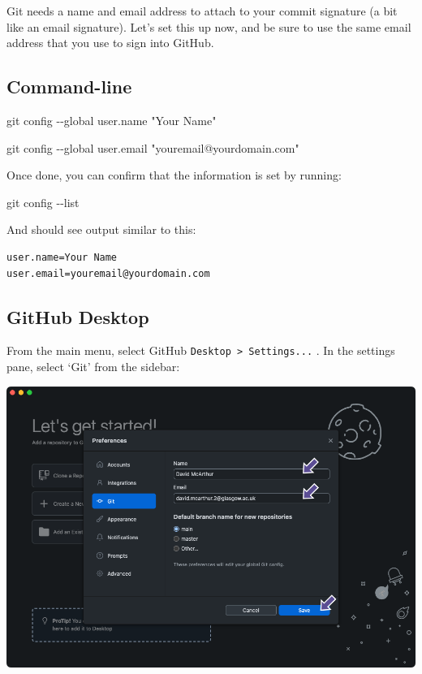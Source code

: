 \documentclass[
  letterpaper,
  DIV=11,
  numbers=noendperiod]{scrartcl}
\newenvironment{Shaded}{\begin{snugshade}}{\end{snugshade}}
\newcommand{\NormalTok}[1]{\textcolor[rgb]{0.00,0.23,0.31}{#1}}
\newcommand{\SpecialCharTok}[1]{\textcolor[rgb]{0.37,0.37,0.37}{#1}}
\newcommand{\StringTok}[1]{\textcolor[rgb]{0.13,0.47,0.30}{#1}}
\begin{document}
Git needs a name and email address to attach to your commit signature (a
bit like an email signature). Let's set this up now, and be sure to use
the same email address that you use to sign into GitHub.

\subsection{Command-line}

\begin{Shaded}
\begin{Highlighting}[]
\NormalTok{git config }\SpecialCharTok{{-}{-}}\NormalTok{global user.name }\StringTok{"Your Name"}

\NormalTok{git config }\SpecialCharTok{{-}{-}}\NormalTok{global user.email }\StringTok{"youremail@yourdomain.com"}
\end{Highlighting}
\end{Shaded}

Once done, you can confirm that the information is set by running:

\begin{Shaded}
\begin{Highlighting}[]
\NormalTok{git config }\SpecialCharTok{{-}{-}}\NormalTok{list}
\end{Highlighting}
\end{Shaded}

And should see output similar to this:

\begin{verbatim}
user.name=Your Name
user.email=youremail@yourdomain.com
\end{verbatim}

\subsection{GitHub Desktop}

From the main menu, select GitHub
\texttt{Desktop\ \textgreater{}\ Settings...} . In the settings pane,
select `Git' from the sidebar:

\includegraphics{images/image4.png}
\end{document}
